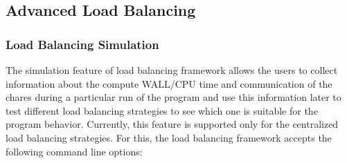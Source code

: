 
\subsection{Advanced Load Balancing}

\label{advancedlb}

\subsubsection{Load Balancing Simulation}

The simulation feature of load balancing framework allows the users to collect information
about the compute WALL/CPU time and communication of the chares during a particular run of
the program and use this information later to test different load balancing strategies to
see which one is suitable for the program behavior. Currently, this feature is supported only for
the centralized load balancing strategies. For this, the load balancing framework
accepts the following command line options:
